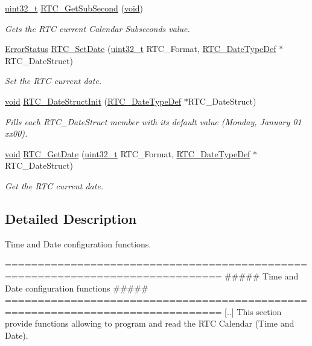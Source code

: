 \begin{DoxyCompactItemize}
\hyperlink{stdint_8h_a435d1572bf3f880d55459d9805097f62}{uint32\-\_\-t} \hyperlink{group___r_t_c___group2_gae59c33fb19e36b6abab0bad58072c01a}{R\-T\-C\-\_\-\-Get\-Sub\-Second} (\hyperlink{group___n_a_m_e_ga18028b8badbf1ea7e704ccac3c488e82}{void})
\begin{DoxyCompactList}\small\item\em Gets the R\-T\-C current Calendar Subseconds value. \end{DoxyCompactList}\item 
\hyperlink{group___exported__types_ga8333b96c67f83cba354b3407fcbb6ee8}{Error\-Status} \hyperlink{group___r_t_c___group2_ga69d08538147f3d89c818dcfabf50e362}{R\-T\-C\-\_\-\-Set\-Date} (\hyperlink{stdint_8h_a435d1572bf3f880d55459d9805097f62}{uint32\-\_\-t} R\-T\-C\-\_\-\-Format, \hyperlink{struct_r_t_c___date_type_def}{R\-T\-C\-\_\-\-Date\-Type\-Def} $\ast$R\-T\-C\-\_\-\-Date\-Struct)
\begin{DoxyCompactList}\small\item\em Set the R\-T\-C current date. \end{DoxyCompactList}\item 
\hyperlink{group___n_a_m_e_ga18028b8badbf1ea7e704ccac3c488e82}{void} \hyperlink{group___r_t_c___group2_ga6e4e99be910d7759f8910056a2985056}{R\-T\-C\-\_\-\-Date\-Struct\-Init} (\hyperlink{struct_r_t_c___date_type_def}{R\-T\-C\-\_\-\-Date\-Type\-Def} $\ast$R\-T\-C\-\_\-\-Date\-Struct)
\begin{DoxyCompactList}\small\item\em Fills each R\-T\-C\-\_\-\-Date\-Struct member with its default value (Monday, January 01 xx00). \end{DoxyCompactList}\item 
\hyperlink{group___n_a_m_e_ga18028b8badbf1ea7e704ccac3c488e82}{void} \hyperlink{group___r_t_c___group2_ga582645d554cdd4a316213e90f0b4c8ae}{R\-T\-C\-\_\-\-Get\-Date} (\hyperlink{stdint_8h_a435d1572bf3f880d55459d9805097f62}{uint32\-\_\-t} R\-T\-C\-\_\-\-Format, \hyperlink{struct_r_t_c___date_type_def}{R\-T\-C\-\_\-\-Date\-Type\-Def} $\ast$R\-T\-C\-\_\-\-Date\-Struct)
\begin{DoxyCompactList}\small\item\em Get the R\-T\-C current date. \end{DoxyCompactList}\end{DoxyCompactItemize}


\subsection{Detailed Description}
Time and Date configuration functions. \begin{DoxyVerb} ===============================================================================
               ##### Time and Date configuration functions #####
 ===============================================================================  
    [..] This section provide functions allowing to program and read the RTC Calendar
         (Time and Date).\end{DoxyVerb}


